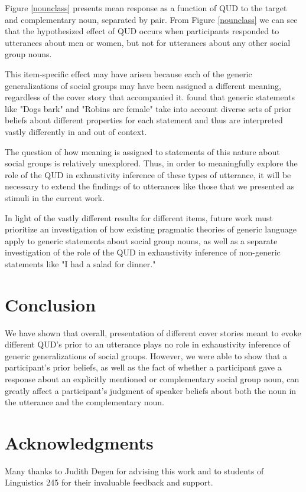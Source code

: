 \documentclass[11pt,a4paper]{article}
\begin{document}
Figure \ref{nounclass} presents mean response as a function of QUD to the target and complementary noun, separated by pair. From Figure \ref{nounclass} we can see that the hypothesized effect of QUD occurs when participants responded to utterances about men or women, but not for utterances about any other social group nouns. 

This item-specific effect may have arisen because each of the generic generalizations of social groups may have been assigned a different meaning, regardless of the cover story that accompanied it. \cite{tessler-goodman} found that generic statements like "Dogs bark" and "Robins are female" take into account diverse sets of prior beliefs about different properties for each statement and thus are interpreted vastly differently in and out of context. 

The question of how meaning is assigned to statements of this nature about social groups is relatively unexplored. Thus, in order to meaningfully explore the role of the QUD in exhaustivity inference of these types of utterance, it will be necessary to extend the findings of \cite{tessler-goodman} to utterances like those that we presented as stimuli in the current work.

In light of the vastly different results for different items, future work must prioritize an investigation of how existing pragmatic theories of generic language apply to generic statements about social group nouns, as well as a separate investigation of the role of the QUD in exhaustivity inference of non-generic statements like "I had a salad for dinner."

\section{Conclusion}
We have shown that overall, presentation of different cover stories meant to evoke different QUD's prior to an utterance plays no role in exhaustivity inference of generic generalizations of social groups. However, we were able to show that a participant's prior beliefs, as well as the fact of whether a participant gave a response about an explicitly mentioned or complementary social group noun, can greatly affect a participant's judgment of speaker beliefs about both the noun in the utterance and the complementary noun. 

\section*{Acknowledgments}

Many thanks to Judith Degen for advising this work and to students of Linguistics 245 for their invaluable feedback and support.

%
%


\end{document}

